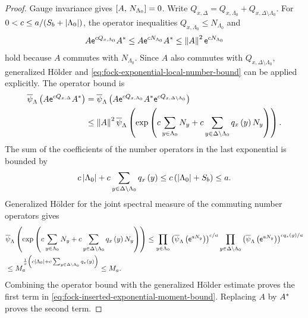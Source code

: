 \documentclass[11pt,a4paper]{article}
\theoremstyle{plain}
\theoremstyle{definition}
\theoremstyle{remark}
\begin{document}
\begin{proof}
Gauge invariance gives $\left[ A,\,N_{\Lambda_0} \right]=0$.
Write $Q_{x,\Delta}=Q_{x,\Lambda_0}+Q_{x,\Delta\setminus \Lambda_0}$.
For $0<c\leq a/(S_b+\left| \Lambda_0 \right|)$, the operator inequalities
$Q_{x,\Lambda_0}\leq N_{\Lambda_0}$ and
$$\begin{aligned}
A\mathsf{e}^{cQ_{x,\Lambda_0}}A^{\ast}
\leq
A\mathsf{e}^{cN_{\Lambda_0}}A^{\ast}
\leq
\left\Vert A \right\Vert^{2}\mathsf{e}^{cN_{\Lambda_0}}
\end{aligned}$$
hold because $A$ commutes with $N_{\Lambda_0}$.
Since $A$ also commutes with $Q_{x,\Delta\setminus \Lambda_0}$, generalized H\"older and
\eqref{eq:fock-exponential-local-number-bound} can be applied explicitly.
The operator bound is
$$\begin{aligned}
\fun{\oastate[\overline{\psi}_{\Lambda}]}{
A\napiernum^{cQ_{x,\Delta}}\faadj{A}}
& =
\fun{\oastate[\overline{\psi}_{\Lambda}]}{
A\napiernum^{cQ_{x,\Lambda_0}}\faadj{A}
\napiernum^{cQ_{x,\Delta\setminus \Lambda_0}}}
\\
& \leq
\norm{A}^{2}
\fun{\oastate[\overline{\psi}_{\Lambda}]}{
\fnexp{
c\sum_{y\in \Lambda_0}N_y
+
c\sum_{y\in \Delta\setminus \Lambda_0}\fun{q_x}{y}N_y}}.
\end{aligned}$$
The sum of the coefficients of the number operators in the last exponential is bounded by
$$\begin{aligned}
c\left| \Lambda_0 \right|
+
c\sum_{y\in \Delta\setminus \Lambda_0}q_x \left( y \right)
\leq
c\left( \left| \Lambda_0 \right|+S_b \right)
\leq
a.
\end{aligned}$$
Generalized H\"older for the joint spectral measure of the commuting number operators gives
$$\begin{aligned}
&
\fun{\oastate[\overline{\psi}_{\Lambda}]}{
\fnexp{
c\sum_{y\in \Lambda_0}N_y
+
c\sum_{y\in \Delta\setminus \Lambda_0}\fun{q_x}{y}N_y}}
\leq
\prod_{y\in \Lambda_0}
\rbk{
\fun{\oastate[\overline{\psi}_{\Lambda}]}{\napiernum^{aN_y}}}^{c/a}
\prod_{y\in \Delta\setminus \Lambda_0}
\rbk{
\fun{\oastate[\overline{\psi}_{\Lambda}]}{\napiernum^{aN_y}}}
^{c\fun{q_x}{y}/a}
\\
& \leq
M_a^{
\frac{1}{a}
\rbk{c\abscard{\Lambda_0}
+
c\sum_{y\in \Delta\setminus \Lambda_0}\fun{q_x}{y}}}
\leq
M_a.
\end{aligned}$$
Combining the operator bound with the generalized Hölder estimate proves the first term in
\eqref{eq:fock-inserted-exponential-moment-bound}.
Replacing $A$ by $A^{\ast}$ proves the second term.
\end{proof}
\end{document}
